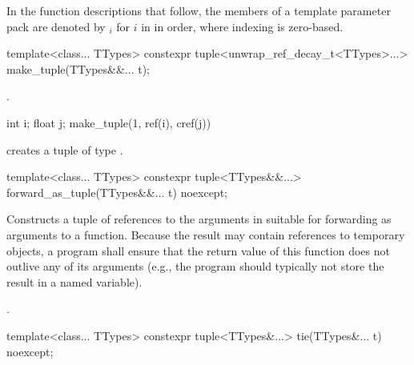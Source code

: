 \pnum
In the function descriptions that follow, the members of a template parameter pack 
are denoted by $_i$ for $i$ in  in
order, where indexing is zero-based.

%
%
\begin{itemdecl}
template<class... TTypes>
  constexpr tuple<unwrap_ref_decay_t<TTypes>...> make_tuple(TTypes&&... t);
\end{itemdecl}

\begin{itemdescr}
\pnum
\returns
{}.

\pnum
\begin{example}
\begin{codeblock}
int i; float j;
make_tuple(1, ref(i), cref(j))
\end{codeblock}
creates a tuple of type .
\end{example}
\end{itemdescr}

%
%
\begin{itemdecl}
template<class... TTypes>
  constexpr tuple<TTypes&&...> forward_as_tuple(TTypes&&... t) noexcept;
\end{itemdecl}

\begin{itemdescr}
\pnum
\effects
Constructs a tuple of references to the arguments in  suitable
for forwarding as arguments to a function. Because the result may contain references
to temporary objects, a program shall ensure that the return value of this
function does not outlive any of its arguments (e.g., the program should typically
not store the result in a named variable).

\pnum
\returns
{}.
\end{itemdescr}

%
%
%
\begin{itemdecl}
template<class... TTypes>
  constexpr tuple<TTypes&...> tie(TTypes&... t) noexcept;
\end{itemdecl}

